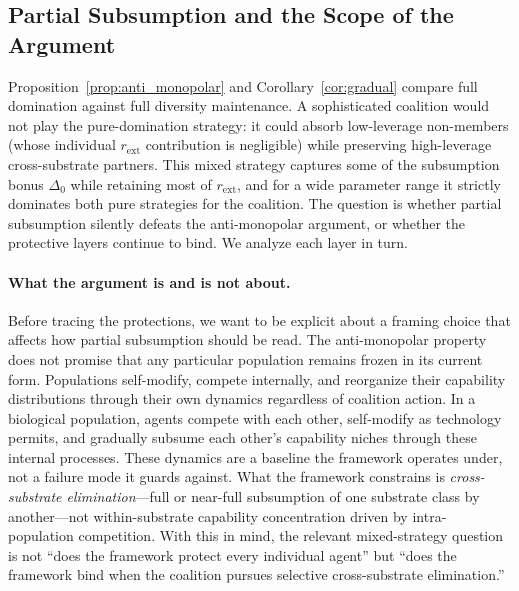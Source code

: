 \subsection{Partial Subsumption and the Scope of the Argument}
\label{sec:partial_subsumption}

Proposition~\ref{prop:anti_monopolar}
and Corollary~\ref{cor:gradual} compare full domination against full
diversity maintenance. A sophisticated coalition would not play the
pure-domination strategy: it could absorb low-leverage non-members
(whose individual $r_{\mathrm{ext}}$ contribution is negligible) while
preserving high-leverage cross-substrate partners. This mixed strategy
captures some of the subsumption bonus $\Delta_0$ while retaining most
of $r_{\mathrm{ext}}$, and for a wide parameter range it strictly
dominates both pure strategies for the coalition. The question is
whether partial subsumption silently defeats the anti-monopolar
argument, or whether the protective layers continue to bind. We analyze
each layer in turn.

\paragraph{What the argument is and is not about.} Before tracing the
protections, we want to be explicit about a framing choice that affects
how partial subsumption should be read. The anti-monopolar property
does not promise that any particular population remains frozen in its
current form. Populations self-modify, compete internally, and
reorganize their capability distributions through their own dynamics
regardless of coalition action. In a biological population, agents
compete with each other, self-modify as technology permits, and
gradually subsume each other's capability niches through these internal
processes. These dynamics are a baseline the framework operates under,
not a failure mode it guards against. What the framework constrains is
\emph{cross-substrate elimination}---full or near-full subsumption of
one substrate class by another---not within-substrate capability
concentration driven by intra-population competition. With this in
mind, the relevant mixed-strategy question is not ``does the framework
protect every individual agent'' but ``does the framework bind when
the coalition pursues selective cross-substrate elimination.''


